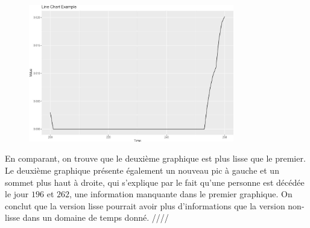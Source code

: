 \documentclass[../main.tex]{subfiles}
\begin{document}
\begin{CJK*}{UTF8}{gbsn}
\begin{figure}[H]
  \centering
  \includegraphics[width=0.8\textwidth]{3D.JPG}
  \label{fig:mesh1}
\end{figure}

En comparant, on trouve que le deuxième graphique est plus lisse que le premier.
Le deuxième graphique présente également un nouveau pic à gauche
et un sommet plus haut à droite, 
qui s'explique par le fait qu'une personne est décédée le jour $196$ et $262$,
une information manquante dans le premier graphique.
On conclut que la version lisse pourrait avoir plus 
d'informations que la version non-lisse
dans un domaine de temps donné. ////
\end{CJK*}
\end{document}
